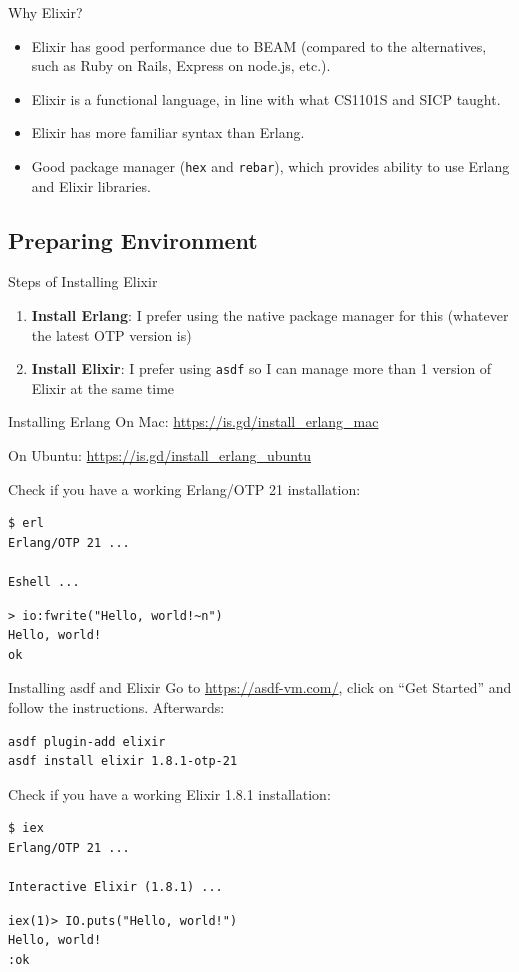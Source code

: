 \documentclass[12pt]{beamer}
\begin{document}
\begin{frame}{Why Elixir?}
  \begin{itemize}
    \item Elixir has good performance due to BEAM (compared to the alternatives, such as Ruby on Rails, Express on node.js, etc.).
    \item Elixir is a functional language, in line with what CS1101S and SICP taught.
    \item Elixir has more familiar syntax than Erlang.
    \item Good package manager (\texttt{hex} and \texttt{rebar}), which provides ability to use Erlang and Elixir libraries.
  \end{itemize}
\end{frame}

\subsection{Preparing Environment}
\begin{frame}{Steps of Installing Elixir}
  \begin{enumerate}
    \item \textbf{Install Erlang}: I prefer using the native package manager for this (whatever the latest OTP version is)
    \item \textbf{Install Elixir}: I prefer using \texttt{asdf} so I can manage more than 1 version of Elixir at the same time
  \end{enumerate}
\end{frame}

\begin{frame}[fragile]{Installing Erlang}
  On Mac: \url{https://is.gd/install_erlang_mac}

  On Ubuntu: \url{https://is.gd/install_erlang_ubuntu}

  Check if you have a working Erlang/OTP 21 installation:
  \begin{verbatim}
$ erl
Erlang/OTP 21 ...

Eshell ...
  \end{verbatim}
  \begin{verbatim}
> io:fwrite("Hello, world!~n")
Hello, world!
ok
  \end{verbatim}
\end{frame}

\begin{frame}[fragile]{Installing asdf and Elixir}
  Go to \url{https://asdf-vm.com/}, click on ``Get Started'' and follow the instructions. Afterwards:
  \begin{verbatim}
asdf plugin-add elixir
asdf install elixir 1.8.1-otp-21
  \end{verbatim}

  Check if you have a working Elixir 1.8.1 installation:
  \begin{verbatim}
$ iex
Erlang/OTP 21 ...

Interactive Elixir (1.8.1) ...
  \end{verbatim}
  \begin{verbatim}
iex(1)> IO.puts("Hello, world!")
Hello, world!
:ok
  \end{verbatim}
\end{frame}
\end{document}
